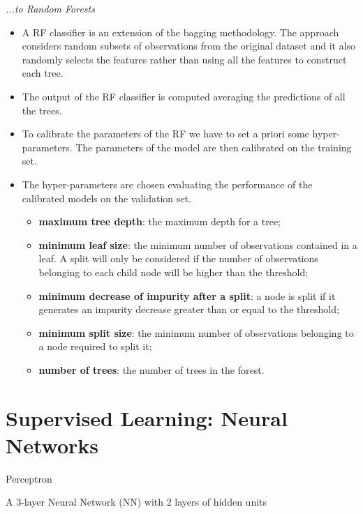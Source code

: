 \textit{...to Random Forests}
\begin{itemize}
    \item A RF classifier is an extension of the bagging methodology. The approach considers random subsets of observations from the original dataset and it also randomly selects the features rather than using all the features to construct each tree.
    \item The output of the RF classifier is computed averaging the predictions of all the trees.
\end{itemize}

\begin{itemize}
    \item To calibrate the parameters of the RF we have to set a priori some hyper-parameters. The parameters of the model are then calibrated on the training set.
    \item The hyper-parameters are chosen evaluating the performance of the calibrated models on the validation set. 
          \begin{itemize}
              \item \textbf{maximum tree depth}: the maximum depth for a tree; 
              \item \textbf{minimum leaf size}: the minimum number of observations contained in a leaf. A split will only be considered if the number of observations belonging to each child node will be higher than the threshold;
              \item \textbf{minimum decrease of impurity after a split}: a node is split if it generates an impurity decrease greater than or equal to the threshold;
              \item \textbf{minimum split size}: the minimum number of observations belonging to a node required to split it;
              \item \textbf{number of trees}: the number of trees in the forest.
          \end{itemize}
\end{itemize}

\section{Supervised Learning: Neural Networks}

Perceptron


A 3-layer Neural Network (NN) with 2 layers of hidden units



